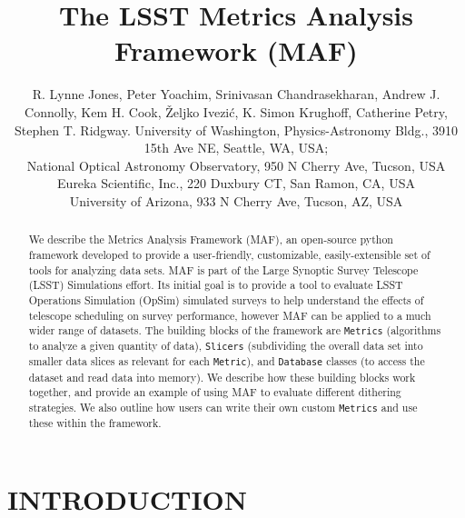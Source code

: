 \documentclass[]{spie}  %
\title{The LSST Metrics Analysis Framework (MAF)}
\author{R. Lynne Jones\supit{a}, Peter Yoachim\supit{a}, Srinivasan
  Chandrasekharan\supit{b}, Andrew J. Connolly\supit{a}, Kem
  H. Cook\supit{c}, {\v Z}eljko Ivezi{\'c}\supit{a},  K. Simon Krughoff\supit{a}, Catherine Petry\supit{d}, Stephen T. Ridgway\supit{b}.
\skiplinehalf
\supit{a}University of Washington, Physics-Astronomy Bldg., 3910 15th
Ave NE,  Seattle, WA, USA; \\
\supit{b}National Optical Astronomy Observatory, 950 N Cherry Ave, Tucson,
USA\\
\supit{c}Eureka Scientific, Inc., 220 Duxbury CT, San Ramon, CA, USA\\
\supit{d}University of Arizona, 933 N Cherry Ave, Tucson, AZ, USA\\
}
\begin{document}
 

  \maketitle 



\begin{abstract}
We describe the Metrics Analysis Framework (MAF), an open-source
python framework developed to provide a user-friendly, customizable,
easily-extensible set of tools for analyzing data sets. MAF is part of
the Large Synoptic Survey Telescope (LSST) Simulations effort. Its
initial goal is to provide a tool to evaluate LSST Operations
Simulation (OpSim) simulated surveys to help understand the effects of
telescope scheduling on survey performance, however MAF can be applied
to a much wider range of datasets. The building blocks of the
framework are {\tt Metrics} (algorithms to analyze a given quantity of data),
{\tt Slicers}
(subdividing the overall data set into smaller data slices as relevant
for each {\tt Metric}), and {\tt Database} classes (to access the dataset and read
data into memory). We describe how these building blocks work
together, and provide an example of using MAF to evaluate different
dithering strategies. We also outline how users can write their own
custom {\tt Metrics} and use these within the framework. 
\end{abstract}


\section{INTRODUCTION}
\label{sec:intro}  
\end{document}
